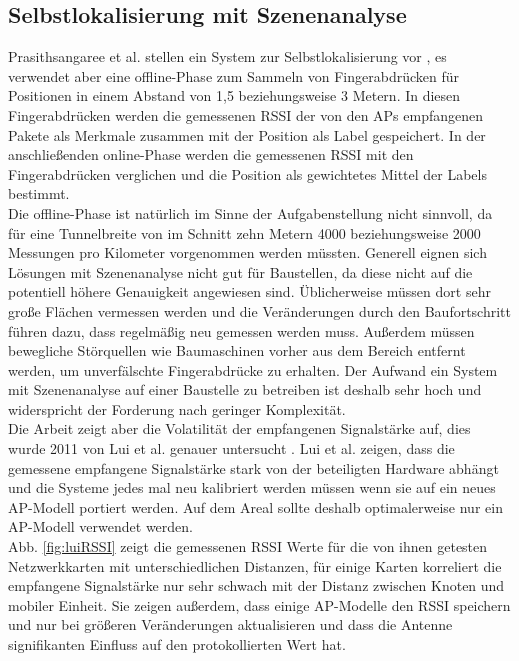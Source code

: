 \subsection{Selbstlokalisierung mit Szenenanalyse}
\label{ch:Vorherige:sec:RSS-basierte}
Prasithsangaree et al. stellen ein System zur Selbstlokalisierung vor \cite{prasithsangaree2002indoor}, es verwendet aber eine offline-Phase zum Sammeln von Fingerabdrücken für Positionen in einem Abstand von 1,5 beziehungsweise 3 Metern. 
In diesen Fingerabdrücken werden die gemessenen RSSI der von den APs empfangenen Pakete als Merkmale zusammen mit der Position als Label gespeichert.
In der anschließenden online-Phase werden die gemessenen RSSI mit den Fingerabdrücken verglichen und die Position als gewichtetes Mittel der Labels bestimmt. \\
Die offline-Phase ist natürlich im Sinne der Aufgabenstellung nicht sinnvoll, da für eine Tunnelbreite von im Schnitt zehn Metern 4000 beziehungsweise 2000 Messungen pro Kilometer vorgenommen werden müssten.
Generell eignen sich Lösungen mit Szenenanalyse nicht gut für Baustellen, da diese nicht auf die potentiell höhere Genauigkeit angewiesen sind. 
Üblicherweise müssen dort sehr große Flächen vermessen werden und die Veränderungen durch den Baufortschritt führen dazu, dass regelmäßig neu gemessen werden muss.
Außerdem müssen bewegliche Störquellen wie Baumaschinen vorher aus dem Bereich entfernt werden, um unverfälschte Fingerabdrücke zu erhalten.
Der Aufwand ein System mit Szenenanalyse auf einer Baustelle zu betreiben ist deshalb sehr hoch und widerspricht der Forderung nach geringer Komplexität. \\
Die Arbeit zeigt aber die Volatilität der empfangenen Signalstärke auf, dies wurde 2011 von Lui et al. genauer untersucht \cite{lui2011differences}.
Lui et al. zeigen, dass die gemessene empfangene Signalstärke stark von der beteiligten Hardware abhängt und die Systeme jedes mal neu kalibriert werden müssen wenn sie auf ein neues AP-Modell portiert werden. 
Auf dem Areal sollte deshalb optimalerweise nur ein AP-Modell verwendet werden. \\
Abb. \ref{fig:luiRSSI} zeigt die gemessenen RSSI Werte für die von ihnen getesten Netzwerkkarten mit unterschiedlichen Distanzen, für einige Karten korreliert die empfangene Signalstärke nur sehr schwach mit der Distanz zwischen Knoten und mobiler Einheit.
Sie zeigen außerdem, dass einige AP-Modelle den RSSI speichern und nur bei größeren Veränderungen aktualisieren und dass die Antenne signifikanten Einfluss auf den protokollierten Wert hat.



